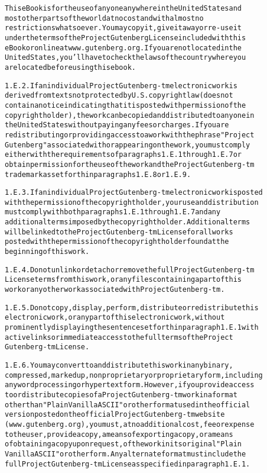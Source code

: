 \documentclass[12pt]{book}[2005/09/16]
\newenvironment{PGtext}{%
\begin{alltt}
%****
\fontsize{8.1}{10}\ttfamily\selectfont}%
{\end{alltt}}
\begin{document}
\begin{PGtext}
  This eBook is for the use of anyone anywhere in the United States and
  most other parts of the world at no cost and with almost no
  restrictions whatsoever. You may copy it, give it away or re-use it
  under the terms of the Project Gutenberg License included with this
  eBook or online at www.gutenberg.org. If you are not located in the
  United States, you'll have to check the laws of the country where you
  are located before using this ebook.

1.E.2. If an individual Project Gutenberg-tm electronic work is
derived from texts not protected by U.S. copyright law (does not
contain a notice indicating that it is posted with permission of the
copyright holder), the work can be copied and distributed to anyone in
the United States without paying any fees or charges. If you are
redistributing or providing access to a work with the phrase "Project
Gutenberg" associated with or appearing on the work, you must comply
either with the requirements of paragraphs 1.E.1 through 1.E.7 or
obtain permission for the use of the work and the Project Gutenberg-tm
trademark as set forth in paragraphs 1.E.8 or 1.E.9.

1.E.3. If an individual Project Gutenberg-tm electronic work is posted
with the permission of the copyright holder, your use and distribution
must comply with both paragraphs 1.E.1 through 1.E.7 and any
additional terms imposed by the copyright holder. Additional terms
will be linked to the Project Gutenberg-tm License for all works
posted with the permission of the copyright holder found at the
beginning of this work.

1.E.4. Do not unlink or detach or remove the full Project Gutenberg-tm
License terms from this work, or any files containing a part of this
work or any other work associated with Project Gutenberg-tm.

1.E.5. Do not copy, display, perform, distribute or redistribute this
electronic work, or any part of this electronic work, without
prominently displaying the sentence set forth in paragraph 1.E.1 with
active links or immediate access to the full terms of the Project
Gutenberg-tm License.

1.E.6. You may convert to and distribute this work in any binary,
compressed, marked up, nonproprietary or proprietary form, including
any word processing or hypertext form. However, if you provide access
to or distribute copies of a Project Gutenberg-tm work in a format
other than "Plain Vanilla ASCII" or other format used in the official
version posted on the official Project Gutenberg-tm web site
(www.gutenberg.org), you must, at no additional cost, fee or expense
to the user, provide a copy, a means of exporting a copy, or a means
of obtaining a copy upon request, of the work in its original "Plain
Vanilla ASCII" or other form. Any alternate format must include the
full Project Gutenberg-tm License as specified in paragraph 1.E.1.


\end{PGtext}
\end{document}
